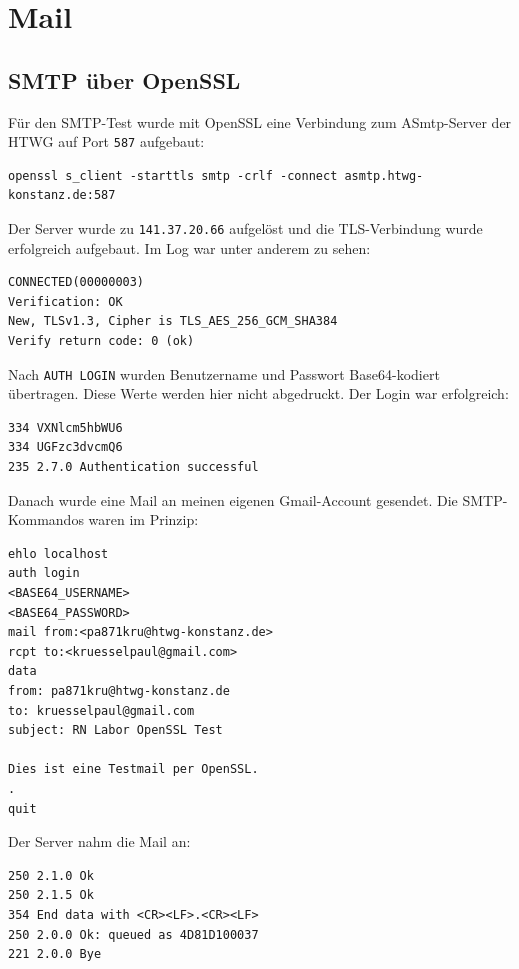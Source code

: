 \documentclass{kdiartcl}
\begin{document}
\section{Mail}

\subsection{SMTP über OpenSSL}

Für den SMTP-Test wurde mit OpenSSL eine Verbindung zum ASmtp-Server der HTWG auf Port \texttt{587} aufgebaut:

\begin{verbatim}
openssl s_client -starttls smtp -crlf -connect asmtp.htwg-konstanz.de:587
\end{verbatim}

Der Server wurde zu \texttt{141.37.20.66} aufgelöst und die TLS-Verbindung wurde erfolgreich aufgebaut. Im Log war unter anderem zu sehen:

\begin{verbatim}
CONNECTED(00000003)
Verification: OK
New, TLSv1.3, Cipher is TLS_AES_256_GCM_SHA384
Verify return code: 0 (ok)
\end{verbatim}

Nach \texttt{AUTH LOGIN} wurden Benutzername und Passwort Base64-kodiert übertragen. Diese Werte werden hier nicht abgedruckt. Der Login war erfolgreich:

\begin{verbatim}
334 VXNlcm5hbWU6
334 UGFzc3dvcmQ6
235 2.7.0 Authentication successful
\end{verbatim}

Danach wurde eine Mail an meinen eigenen Gmail-Account gesendet. Die SMTP-Kommandos waren im Prinzip:

\begin{verbatim}
ehlo localhost
auth login
<BASE64_USERNAME>
<BASE64_PASSWORD>
mail from:<pa871kru@htwg-konstanz.de>
rcpt to:<kruesselpaul@gmail.com>
data
from: pa871kru@htwg-konstanz.de
to: kruesselpaul@gmail.com
subject: RN Labor OpenSSL Test

Dies ist eine Testmail per OpenSSL.
.
quit
\end{verbatim}

Der Server nahm die Mail an:

\begin{verbatim}
250 2.1.0 Ok
250 2.1.5 Ok
354 End data with <CR><LF>.<CR><LF>
250 2.0.0 Ok: queued as 4D81D100037
221 2.0.0 Bye
\end{verbatim}
\end{document}
